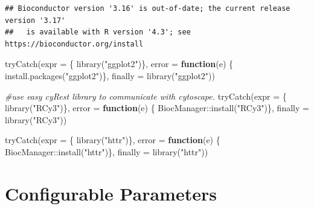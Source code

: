 \documentclass[
]{book}
\newenvironment{Shaded}{\begin{snugshade}}{\end{snugshade}}
\newcommand{\AttributeTok}[1]{\textcolor[rgb]{0.77,0.63,0.00}{#1}}
\newcommand{\CommentTok}[1]{\textcolor[rgb]{0.56,0.35,0.01}{\textit{#1}}}
\newcommand{\ControlFlowTok}[1]{\textcolor[rgb]{0.13,0.29,0.53}{\textbf{#1}}}
\newcommand{\FunctionTok}[1]{\textcolor[rgb]{0.00,0.00,0.00}{#1}}
\newcommand{\NormalTok}[1]{#1}
\newcommand{\SpecialCharTok}[1]{\textcolor[rgb]{0.00,0.00,0.00}{#1}}
\newcommand{\StringTok}[1]{\textcolor[rgb]{0.31,0.60,0.02}{#1}}
\begin{document}
\begin{verbatim}
## Bioconductor version '3.16' is out-of-date; the current release version '3.17'
##   is available with R version '4.3'; see https://bioconductor.org/install
\end{verbatim}

\begin{Shaded}
\begin{Highlighting}[]
\FunctionTok{tryCatch}\NormalTok{(}\AttributeTok{expr =}\NormalTok{ \{ }\FunctionTok{library}\NormalTok{(}\StringTok{"ggplot2"}\NormalTok{)\}, }
         \AttributeTok{error =} \ControlFlowTok{function}\NormalTok{(e) \{ }\FunctionTok{install.packages}\NormalTok{(}\StringTok{"ggplot2"}\NormalTok{)\}, }
         \AttributeTok{finally =} \FunctionTok{library}\NormalTok{(}\StringTok{"ggplot2"}\NormalTok{))}

\CommentTok{\#use easy cyRest library to communicate with cytoscape.}
\FunctionTok{tryCatch}\NormalTok{(}\AttributeTok{expr =}\NormalTok{ \{ }\FunctionTok{library}\NormalTok{(}\StringTok{"RCy3"}\NormalTok{)\}, }
         \AttributeTok{error =} \ControlFlowTok{function}\NormalTok{(e) \{ BiocManager}\SpecialCharTok{::}\FunctionTok{install}\NormalTok{(}\StringTok{"RCy3"}\NormalTok{)\}, }
         \AttributeTok{finally =} \FunctionTok{library}\NormalTok{(}\StringTok{"RCy3"}\NormalTok{))}

\FunctionTok{tryCatch}\NormalTok{(}\AttributeTok{expr =}\NormalTok{ \{ }\FunctionTok{library}\NormalTok{(}\StringTok{"httr"}\NormalTok{)\}, }
         \AttributeTok{error =} \ControlFlowTok{function}\NormalTok{(e) \{ BiocManager}\SpecialCharTok{::}\FunctionTok{install}\NormalTok{(}\StringTok{"httr"}\NormalTok{)\}, }
         \AttributeTok{finally =} \FunctionTok{library}\NormalTok{(}\StringTok{"httr"}\NormalTok{))}
\end{Highlighting}
\end{Shaded}

\hypertarget{configurable-parameters-1}{%
\section{Configurable Parameters}\label{configurable-parameters-1}}
\end{document}
